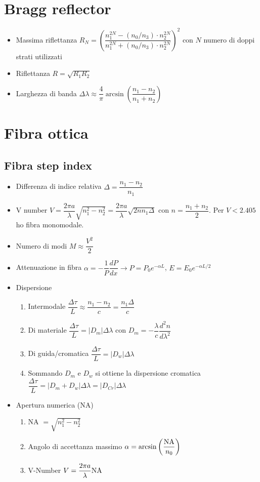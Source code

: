 \documentclass{article}
\begin{document}
\section{Bragg reflector}
\begin{itemize}
	\item Massima riflettanza \( R_N = \left(\dfrac{n_1^{2N} - (n_0 / n_3) \cdot n_2^{2N}}{n_1^{2N} + (n_0 / n_3) \cdot n_2^{2N}} \right) ^ 2 \) con \( N \) numero di doppi strati utilizzati
	\item Riflettanza \( \displaystyle R = \sqrt{R_1 R_2} \)	
	\item Larghezza di banda \( \Delta \lambda \approx \dfrac{4}{\pi} \arcsin \left( \dfrac{n_1 - n_2}{n_1 + n_2} \right) \)
\end{itemize}

\section{Fibra ottica}
\subsection{Fibra step index}
\begin{itemize}
	\item Differenza di indice relativa \(  \Delta = \dfrac{n_1 - n_2}{n_1} \)
	\item V number \(  V = \dfrac{2 \pi a}{\lambda} \sqrt{n_1^2 - n_2^2} = \dfrac{2 \pi a}{\lambda} \sqrt{2 n n_1 \Delta}\) con \(  n = \dfrac{n_1 + n_2}{2} \). Per \( V < 2.405 \) ho fibra monomodale.
	\item Numero di modi \(  M \approx \dfrac{V^2}{2} \)
	\item Attenuazione in fibra \(  \alpha = - \dfrac{1}{P} \dfrac{dP}{dx} \rightarrow P = P_0 e^{-\alpha L}\), \(   E = E_0 e^{-\alpha L / 2} \)
	\item Dispersione
	\begin{enumerate}
		\item Intermodale \(  \dfrac{\Delta \tau}{L} \approx \dfrac{n_1 - n_2}{c} = \dfrac{n_1 \Delta}{c} \)
		\item Di materiale \(  \dfrac{\Delta \tau}{L} = | D_m | \Delta \lambda \) con \( D_m = -\dfrac{\lambda}{c} \dfrac{d^2 n}{d \lambda^2} \)
		\item Di guida/cromatica \(  \dfrac{\Delta \tau}{L} = | D_w | \Delta \lambda \)
		\item Sommando \( D_m \) e \( D_w \) si ottiene la dispersione cromatica \( \dfrac{\Delta \tau}{L} = | D_m + D_w | \Delta \lambda = | D_{Cr} | \Delta \lambda \)
	\end{enumerate}
	\item Apertura numerica (NA)
	\begin{enumerate}
		\item NA \( \displaystyle = \sqrt{n_1^2 - n_2^2} \)
		\item Angolo di accettanza massimo \( \alpha = \arcsin \left( \dfrac{\textnormal{NA}}{n_0} \right) \)
		\item V-Number \( V = \dfrac{2 \pi a}{\lambda} \textnormal{NA} \)
	\end{enumerate}
\end{itemize}
\end{document}
